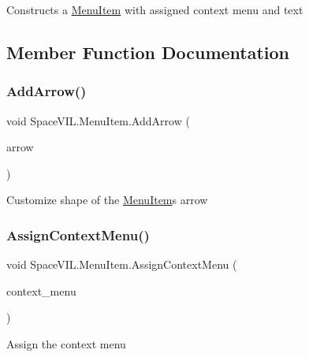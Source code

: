 Constructs a \mbox{\hyperlink{class_space_v_i_l_1_1_menu_item}{Menu\+Item}} with assigned context menu and text 



\subsection{Member Function Documentation}
\mbox{\label{class_space_v_i_l_1_1_menu_item_a54c3c774c9108d3bd599b4e464f7fcd1}} 
\subsubsection{\texorpdfstring{Add\+Arrow()}{AddArrow()}}
{\footnotesize\ttfamily void Space\+V\+I\+L.\+Menu\+Item.\+Add\+Arrow (\begin{DoxyParamCaption}\item[{\mbox{\hyperlink{class_space_v_i_l_1_1_custom_shape}{Custom\+Shape}}}]{arrow }\end{DoxyParamCaption})}



Customize shape of the \mbox{\hyperlink{class_space_v_i_l_1_1_menu_item}{Menu\+Item}}\textquotesingle{}s arrow 

\mbox{\label{class_space_v_i_l_1_1_menu_item_a1525b3cbf3eda9f35e9ad993326512be}} 
\subsubsection{\texorpdfstring{Assign\+Context\+Menu()}{AssignContextMenu()}}
{\footnotesize\ttfamily void Space\+V\+I\+L.\+Menu\+Item.\+Assign\+Context\+Menu (\begin{DoxyParamCaption}\item[{\mbox{\hyperlink{class_space_v_i_l_1_1_context_menu}{Context\+Menu}}}]{context\+\_\+menu }\end{DoxyParamCaption})}



Assign the context menu 

